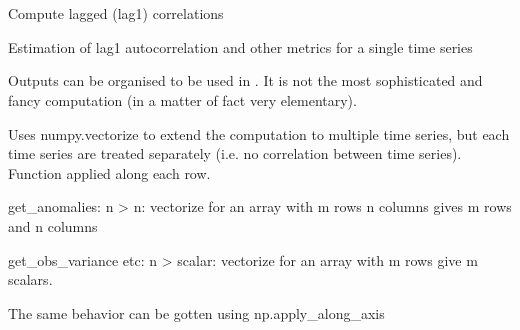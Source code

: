 \documentclass[letterpaper,10pt,english]{sphinxmanual}
\begin{document}
\section{}
\label{\detokenize{kalman:module-glomar_gridding.autocorrelation.compute_autocorrelation}}\label{\detokenize{kalman:autocorrelation}}
\sphinxAtStartPar
Compute lagged (lag\sphinxhyphen{}1) correlations

\sphinxAtStartPar
Estimation of lag\sphinxhyphen{}1 autocorrelation and other metrics
for a single time series

\sphinxAtStartPar
Outputs can be organised to be used 
in . It is not the most sophisticated and fancy
computation (in a matter of fact very elementary).

\sphinxAtStartPar
Uses numpy.vectorize to extend the computation to multiple time series,
but each time series are treated separately (i.e. no correlation
between time series). Function applied along each row.

\sphinxAtStartPar
get\_anomalies: n \sphinxhyphen{}\textgreater{} n:
vectorize for an array with m rows n columns gives m rows and n columns

\sphinxAtStartPar
get\_obs\_variance etc: n \sphinxhyphen{}\textgreater{} scalar:
vectorize for an array with m rows give m scalars.

\sphinxAtStartPar
The same behavior can be gotten using np.apply\_along\_axis
\end{document}
